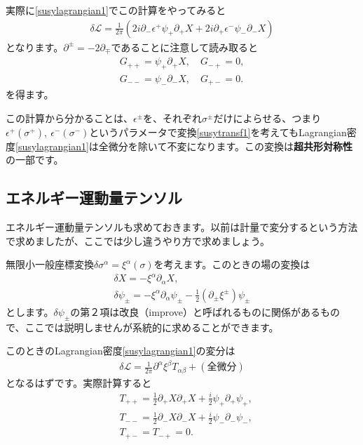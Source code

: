 \documentclass[report,paper=a4, fontsize=12pt, line_length=16cm, number_of_lines=34,dvipdfmx]{jlreq}
\numberwithin{equation}{chapter}
\numberwithin{equation}{section}
\newcommand{\del}{\partial}
\newcommand{\kyou}[1]{{\sffamily \bfseries #1}}
\newcommand{\Lcal}{\mathcal{L}}
\begin{document}
実際に\eqref{susylagrangian1}でこの計算をやってみると
\begin{align}
  \delta \Lcal = \frac{1}{2\pi}
  \left( 
    2i\del_{-}\epsilon^{+} \psi_{+}\del_{+}X +2i \del_{+}\epsilon^{-}\psi_{-}\del_{-}X
   \right)
\end{align}
となります。$\del^{\pm}=-2\del_{\mp}$であることに注意して読み取ると
\begin{align}
  G_{++}=\psi_{+}\del_{+}X,\quad G_{-+}=0,\nonumber\\
  G_{--}=\psi_{-}\del_{-}X,\quad G_{+-}=0.
\label{SUSYcurrent1}
\end{align}
を得ます。

この計算から分かることは、$\epsilon^{\pm}$を、それぞれ$\sigma^{\pm}$だけによらせる、つまり$\epsilon^{+}(\sigma^{+}),\ \epsilon^{-}(\sigma^{-})$というパラメータで変換\eqref{susytransf1}を考えてもLagrangian密度\eqref{susylagrangian1}は全微分を除いて不変になります。この変換は\kyou{超共形対称性}の一部です。

\subsection{エネルギー運動量テンソル}
エネルギー運動量テンソルも求めておきます。以前は計量で変分するという方法で求めましたが、ここでは少し違うやり方で求めましょう。

無限小一般座標変換$\delta \sigma^{\alpha}=\xi^{\alpha}(\sigma)$を考えます。このときの場の変換は
\begin{align}
  \delta X=-\xi^{\alpha}\del_{\alpha}X,\\
  \delta \psi_{\pm}=-\xi^{\alpha}\del_{\alpha}\psi_{\pm}-\frac12(\del_{\pm}\xi^{\pm})\psi_{\pm}\label{susyconformaltransf}
\end{align}
とします。$\delta \psi_{\pm}$の第２項は改良（improve）と呼ばれるものに関係があるもので、ここでは説明しませんが系統的に求めることができます。

このときのLagrangian密度\eqref{susylagrangian1}の変分は
\begin{align}
  \delta \Lcal = \frac{1}{2\pi}\del^{\alpha}\xi^{\beta}T_{\alpha\beta}+(\text{全微分})
\end{align}
となるはずです。実際計算すると
\begin{align}
  &T_{++}=\frac12\del_{+}X\del_{+}X+\frac{i}{2}\psi_{+}\del_{+}\psi_{+},\nonumber\\
  &T_{--}=\frac12\del_{-}X\del_{-}X+\frac{i}{2}\psi_{-}\del_{-}\psi_{-},\nonumber\\
  &T_{+-}=T_{-+}=0.\label{EMtensorSUSYsystem}
\end{align}
\end{document}
